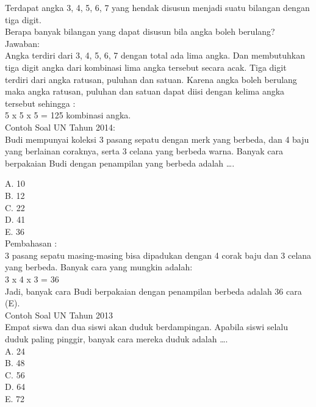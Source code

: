 \documentclass[11pt,fleqn]{book} %
\begin{document}
Terdapat angka 3, 4, 5, 6, 7 yang hendak disusun menjadi suatu bilangan dengan tiga digit. \\
Berapa banyak bilangan yang dapat disusun bila angka boleh berulang?\\

Jawaban:\\

Angka terdiri dari 3, 4, 5, 6, 7 dengan total ada lima angka. Dan membutuhkan tiga digit angka dari kombinasi lima angka tersebut secara acak. Tiga digit terdiri dari angka ratusan, puluhan dan satuan. Karena angka boleh berulang maka angka ratusan, puluhan dan satuan dapat diisi dengan kelima angka tersebut sehingga :\\

 5 x 5 x 5 = 125 kombinasi angka.\\
 
Contoh Soal UN Tahun 2014:\\

Budi mempunyai koleksi 3 pasang sepatu dengan merk yang berbeda, dan 4 baju yang berlainan coraknya, serta 3 celana yang berbeda warna. Banyak cara berpakaian Budi dengan penampilan yang berbeda adalah ….

A.   10\\
B.   12\\
C.   22\\
D.   41\\
E.   36\\

Pembahasan :\\

3 pasang sepatu masing-masing bisa dipadukan dengan 4 corak baju dan 3 celana yang berbeda. Banyak cara yang mungkin adalah:\\

3 x 4 x 3 = 36\\

Jadi, banyak cara Budi berpakaian dengan penampilan berbeda adalah 36 cara (E).\\

Contoh Soal UN Tahun 2013\\
Empat siswa dan dua siswi akan duduk berdampingan. Apabila siswi selalu duduk paling pinggir, banyak cara mereka duduk adalah ….\\

A.   24\\
B.   48\\
C.   56\\
D.   64\\
E.   72\\
\end{document}
